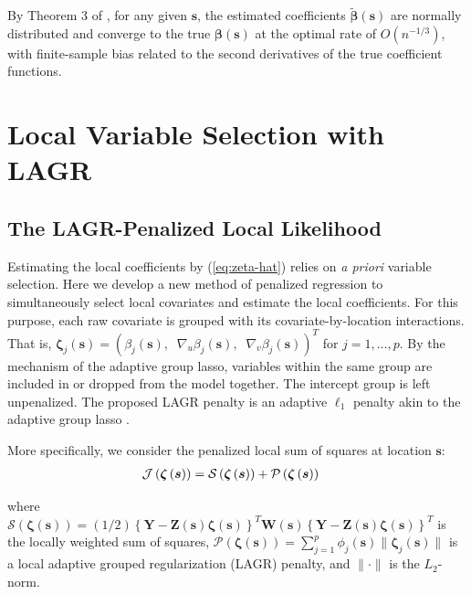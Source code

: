 \documentclass[english]{article}\usepackage[]{graphicx}\usepackage[]{color}
\theoremstyle{plain}
\theoremstyle{plain}
\begin{document}
By Theorem 3 of \citet{Sun-Yan-Zhang-Lu-2014}, for any given $\bm{s}$,
the estimated coefficients $\tilde{\bm{\beta}}\left(\bm{s}\right)$
are normally distributed and converge to the true $\bm{\beta}\left(\bm{s}\right)$
at the optimal rate of $O\left(n^{-1/3}\right)$, with finite-sample
bias related to the second derivatives of the true coefficient functions.


\section{Local Variable Selection with LAGR\label{sec:lagr-gaussian}}


\subsection{The LAGR-Penalized Local Likelihood}

Estimating the local coefficients by (\ref{eq:zeta-hat}) relies on
\emph{a priori} variable selection. Here we develop a new method of
penalized regression to simultaneously select local covariates and
estimate the local coefficients. For this purpose, each raw covariate
is grouped with its covariate-by-location interactions. That is, $\bm{\zeta}_{j}(\bm{s})=\left(\beta_{j}(\bm{s}),\;\;\nabla_{u}\beta_{j}(\bm{s}),\;\;\nabla_{v}\beta_{j}(\bm{s})\right)^{T}$
for $j=1,\dots,p$. By the mechanism of the adaptive group lasso,
variables within the same group are included in or dropped from the
model together. The intercept group is left unpenalized. The proposed
LAGR penalty is an adaptive $\ell_{1}$ penalty akin to the adaptive
group lasso \citep{Wang-Leng-2008,Zou-2006}.

More specifically, we consider the penalized local sum of squares
at location $\bm{s}$: 
\begin{align}
\mathcal{J}\left(\bm{\zeta}\left(\bm{s}\right)\right) & =\mathcal{S}\left(\bm{\zeta}\left(\bm{s}\right)\right)+\mathcal{P}\left(\bm{\zeta}\left(\bm{s}\right)\right)\notag\label{eq:adaptive-lasso-WLS}
\end{align}


where $\mathcal{S}\left(\bm{\zeta}\left(\bm{s}\right)\right)=(1/2)\left\{ \bm{Y}-\bm{Z}(\bm{s})\bm{\zeta}(\bm{s})\right\} ^{T}\bm{W}(\bm{s})\left\{ \bm{Y}-\bm{Z}(\bm{s})\bm{\zeta}(\bm{s})\right\} ^{T}$
is the locally weighted sum of squares, $\mathcal{P}\left(\bm{\zeta}\left(\bm{s}\right)\right)=\sum_{j=1}^{p}\phi_{j}(\bm{s})\|\bm{\zeta}_{j}(\bm{s})\|$
is a local adaptive grouped regularization (LAGR) penalty, and $\|\cdot\|$
is the $L_{2}$-norm.
\end{document}
